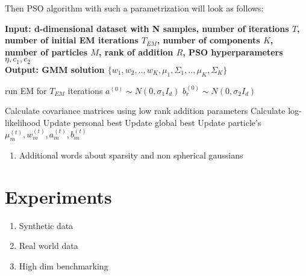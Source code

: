 \documentclass[a4paper]{article}
\begin{document}
 Then PSO algorithm with such a parametrization will look as follows:
 \begin{algorithm}
    \caption{}\label{alg:cap}
    \hspace*{\algorithmicindent} \textbf{Input: d-dimensional dataset with N samples, number of iterations $T$, number of initial EM iterations $T_{EM}$, 
    number of components $K$, number of particles $M$, rank of addition $R$,
    PSO hyperparameters $\eta, c_1, c_2$} \\
    \hspace*{\algorithmicindent} \textbf{Output: GMM solution $\{w_1, w_2, .., w_K, \mu_1, \Sigma_1, .., \mu_K, \Sigma_K\}$} 
    \begin{algorithmic}
    \State run EM for $T_{EM}$ iterations
        \State $a^{(0)}\sim N(0, \sigma_1I_d)$ 
            \State $b^{(0)}_r \sim N(0, \sigma_2 I_d)$
        \EndFor
    \EndFor
    
            \State Calculate covariance matrices using low rank addition parameters
            \State Calculate log-likelihood
            \State Update personal best
         \EndFor
         \State Update global best
            \State Update particle's $\mu_m^{(t)}, w_m^{(t)}, a_m^{(t)}, b_m^{(t)}$
         \EndFor
     \EndFor
     \end{algorithmic}
     \end{algorithm}
 
\begin{enumerate}
    \item Additional words about sparsity and non spherical gaussians
\end{enumerate}

\section{Experiments}

\begin{enumerate}
    \item Synthetic data
    \item Real world data
    \item High dim benchmarking
\end{enumerate}



\end{document}
